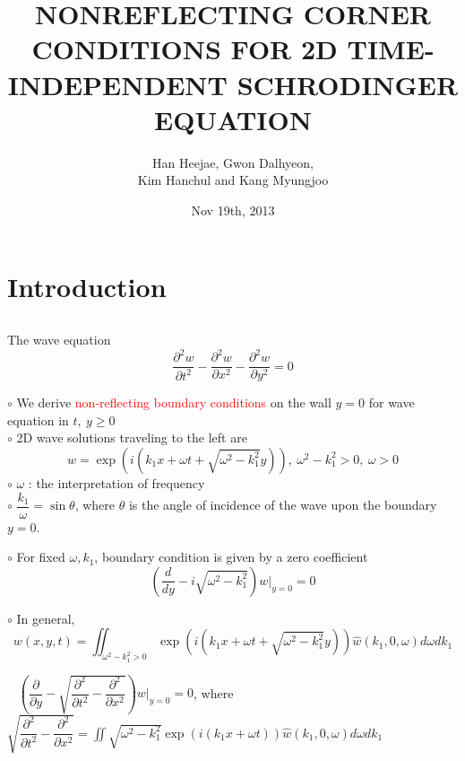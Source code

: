 \documentclass{beamer}%
\begin{document}
\title{NONREFLECTING CORNER CONDITIONS FOR 2D TIME-INDEPENDENT SCHRODINGER EQUATION}
\author{Han Heejae, Gwon Dalhyeon,\\ Kim Hanchul and Kang Myungjoo}
\date{Nov 19th, 2013}
\frame{\titlepage}
\frame{\tableofcontents}


\section{Introduction}
\subsection{}
\frame
{
\small 

\begin{block}{The wave equation}
$$\dfrac{\partial^2 w}{\partial t^2}-\dfrac{\partial^2 w}{\partial x^2}-\dfrac{\partial^2 w}{\partial y^2}=0$$
\end{block}
$\circ$ We derive \textcolor{red}{non-reflecting boundary conditions} on the wall $y=0$ for wave equation in $t,~y \geq 0$\\

$\circ$ 2D wave solutions traveling to the left are
$$w= \exp(i(k_1 x + \omega t + \sqrt{\omega^2-k_1^2}y)), ~ \omega^2-k_1^2 >0, ~\omega>0  $$
$\circ$ $\omega$ : the interpretation of frequency\\
$\circ$ $\dfrac{k_1}{\omega}=\sin\theta$, where $\theta$ is the angle of incidence of the wave upon the boundary $y=0$.
}


\frame
{
\small
$\circ$ For fixed $\omega, k_1$, boundary condition is given by a zero coefficient
$$\left(\dfrac{d}{dy}-i\sqrt{\omega^2-k_1^2}\right)w|_{y=0}=0$$

$\circ$ In general, 
$$w(x,y,t)=\iint_{\omega^2-k_1^2 >0}\exp(i(k_1 x + \omega t + \sqrt{\omega^2-k_1^2}y))\hat{w}(k_1, 0,  \omega)d\omega dk_1$$

\Rightarrow ~
$\left(\dfrac{\partial}{\partial y}-\sqrt{\dfrac{\partial^2}{\partial t^2}-\dfrac{\partial^2}{\partial x^2}}\right)w|_{y=0}=0$, where
$\displaystyle \sqrt{\dfrac{\partial^2}{\partial t^2}-\dfrac{\partial^2}{\partial x^2}}=\iint \sqrt{\omega^2-k_1^2}\exp(i(k_1 x + \omega t))\hat{w}(k_1, 0,  \omega)d\omega dk_1$

}
\end{document}

